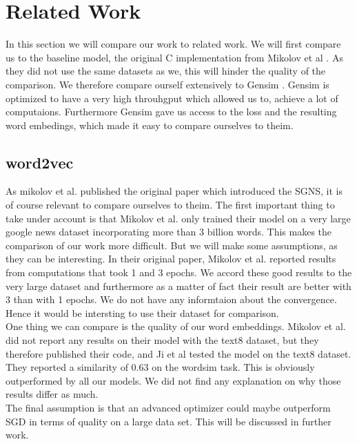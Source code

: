 \section{Related Work}
In this section we will compare our work to related work. We will first compare us to the baseline model, the original C implementation from Mikolov et al \cite{Mikolov}. As they did not use the same datasets as we, this will hinder the quality of the comparison. We therefore compare ourself extensively to Gensim \cite{gensim}. Gensim is optimized to have a very high throuhgput which allowed us to, achieve a lot of computaions. Furthermore Gensim gave us access to the loss and the resulting word embedings, which made it easy  to compare ourselves to theim. 

\subsection{word2vec}

As mikolov et al. published the original paper which introduced the SGNS, it is of course relevant to compare ourselves to theim. The first important thing to take under account is that Mikolov et al. only trained their model on a very large google news dataset incorporating more than 3 billion words. This makes the comparison of our work more difficult. But we will make some assumptions, as they can be interesting. 
In their original paper, Mikolov et al. reported results from computations that took 1 and 3 epochs. We accord these good results to the very large dataset  and furthermore as a matter of fact their result are better with 3 than with 1 epochs. We do not have any informtaion about the convergence. Hence it would be intersting to use their dataset for comparison. \\
One thing we can compare is the quality of our word embeddings. Mikolov et al. did not report any results on their model with the text8 dataset, but they therefore published their code, and Ji et al \cite{intel} tested the model on the text8 dataset. They reported a similarity of 0.63 on the wordsim task. This is obviously outperformed by all our models. We did not find any explanation on why those results differ as much. \\
The final assumption is that an advanced optimizer could maybe outperform SGD in terms of quality on a large data set. This will be discussed in further work.
 


